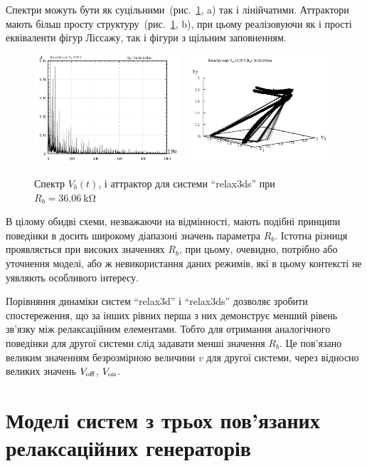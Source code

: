 Спектри можуть бути як суцільними~(рис.~\ref{atu:f:relax3ds_f_36060},
a) так і лінійчатими. Аттрактори мають більш просту
структуру~(рис.~\ref{atu:f:relax3ds_f_36060}, b), при цьому реалізовуючи як
і прості еквіваленти фігур Ліссажу, так і фігури з щільним
заповненням.

\begin{figure}[htb!]
  \centerline{
    \includegraphics[width=0.48\textwidth]{p/relax3ds_f_036060.png}
    ~
    \includegraphics[width=0.48\textwidth]{p/relax3ds_v1v2v3_036060.png}
  }
  \caption{Спектр $V_b(t)$, і аттрактор для системи ``relax3ds'' при $R_b=\SI{36.06}{\kilo \ohm} $}
  \label{atu:f:relax3ds_f_36060}
\end{figure}

В цілому обидві схеми, незважаючи на відмінності, мають подібні
принципи поведінки в досить широкому діапазоні значень
параметра
$R_b$. Істотна різниця проявляється при високих значеннях
$R_b$, при цьому, очевидно, потрібно або уточнення моделі, або ж
невикористання даних режимів, які в цьому контексті не уявляють
особливого інтересу.


Порівняння динаміки систем ``relax3d'' і ``relax3ds'' дозволяє зробити
спостереження, що за інших рівних перша з них демонструє менший
рівень зв'язку між релаксаційним елементами. Тобто для отримання
аналогічного поведінки для другої системи слід задавати менші
значення
$ R_b $. Це пов'язано великим значенням безрозмірною величини
$ v $ для другої системи, через відносно великих значень
$ V _\mathrm{off} $,
$ V _\mathrm{on} $.


\section{Моделі систем з трьох пов'язаних релаксаційних генераторів}

